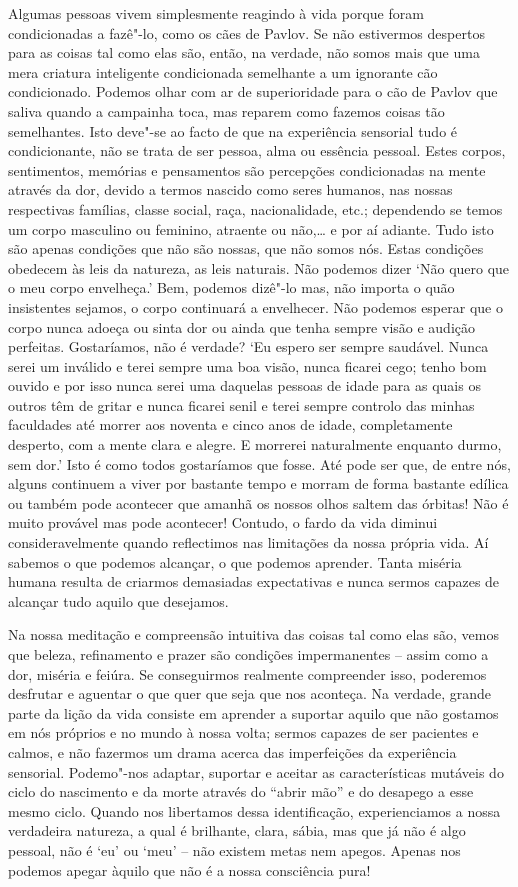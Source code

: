 Algumas pessoas vivem simplesmente reagindo à vida porque foram
condicionadas a fazê"-lo, como os cães de Pavlov. Se não estivermos
despertos para as coisas tal como elas são, então, na verdade, não somos
mais que uma mera criatura inteligente condicionada semelhante a um
ignorante cão condicionado. Podemos olhar com ar de superioridade para o
cão de Pavlov que saliva quando a campainha toca, mas reparem como
fazemos coisas tão semelhantes. Isto deve"-se ao facto de que na
experiência sensorial tudo é condicionante, não se trata de ser pessoa,
alma ou essência pessoal. Estes corpos, sentimentos, memórias e
pensamentos são percepções condicionadas na mente através da dor, devido
a termos nascido como seres humanos, nas nossas respectivas famílias,
classe social, raça, nacionalidade, etc.; dependendo se temos um corpo
masculino ou feminino, atraente ou não,\ldots{} e por aí adiante. Tudo
isto são apenas condições que não são nossas, que não somos nós. Estas
condições obedecem às leis da natureza, as leis naturais. Não podemos
dizer `Não quero que o meu corpo envelheça.' Bem, podemos dizê"-lo mas,
não importa o quão insistentes sejamos, o corpo continuará a envelhecer.
Não podemos esperar que o corpo nunca adoeça ou sinta dor ou ainda que
tenha sempre visão e audição perfeitas. Gostaríamos, não é verdade? `Eu
espero ser sempre saudável. Nunca serei um inválido e terei sempre uma
boa visão, nunca ficarei cego; tenho bom ouvido e por isso nunca serei
uma daquelas pessoas de idade para as quais os outros têm de gritar e
nunca ficarei senil e terei sempre controlo das minhas faculdades até
morrer aos noventa e cinco anos de idade, completamente desperto, com a
mente clara e alegre. E morrerei naturalmente enquanto durmo, sem dor.'
Isto é como todos gostaríamos que fosse. Até pode ser que, de entre nós,
alguns continuem a viver por bastante tempo e morram de forma bastante
edílica ou também pode acontecer que amanhã
os nossos olhos saltem das órbitas! Não é muito provável mas pode
acontecer! Contudo, o fardo da vida diminui consideravelmente quando
reflectimos nas limitações da nossa própria vida. Aí sabemos o que
podemos alcançar, o que podemos aprender. Tanta miséria humana resulta
de criarmos demasiadas expectativas e nunca sermos capazes de alcançar
tudo aquilo que desejamos.

Na nossa meditação e compreensão intuitiva das coisas tal como elas são,
vemos que beleza, refinamento e prazer são condições impermanentes --
assim como a dor, miséria e feiúra. Se conseguirmos realmente
compreender isso, poderemos desfrutar e aguentar o que quer que seja que
nos aconteça. Na verdade, grande parte da lição da vida consiste em
aprender a suportar aquilo que não gostamos em nós próprios e no mundo à
nossa volta; sermos capazes de ser pacientes e calmos, e não fazermos um
drama acerca das imperfeições da experiência sensorial. Podemo"-nos
adaptar, suportar e aceitar as características mutáveis do ciclo do
nascimento e da morte através do ``abrir mão'' e do desapego a esse
mesmo ciclo. Quando nos libertamos dessa identificação, experienciamos a
nossa verdadeira natureza, a qual é brilhante, clara, sábia, mas que já
não é algo pessoal, não é `eu' ou `meu' -- não existem metas nem apegos.
Apenas nos podemos apegar àquilo que não é a nossa consciência pura!

